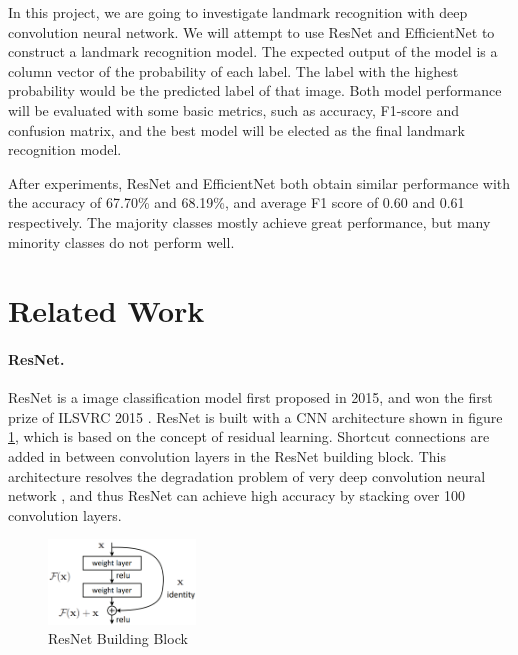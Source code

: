 \documentclass[10pt,twocolumn,letterpaper]{article}
\begin{document}
In this project, we are going to investigate landmark recognition with deep convolution neural network. We will attempt to use ResNet\cite{he_deep_2015} and EfficientNet\cite{tan_efficientnet_2020} to construct a landmark recognition model. The expected output of the model is a column vector of the probability of each label. The label with the highest probability would be the predicted label of that image. Both model performance will be evaluated with some basic metrics, such as accuracy, F1-score and confusion matrix, and the best model will be elected as the final landmark recognition model.

After experiments, ResNet and EfficientNet both obtain similar performance with the accuracy of 67.70\% and 68.19\%, and average F1 score of 0.60 and 0.61 respectively. The majority classes mostly achieve great performance, but many minority classes do not perform well.

\section{Related Work}
\paragraph{ResNet.} ResNet \cite{he_deep_2015} is a image classification model first proposed in 2015, and won the first prize of ILSVRC 2015 \cite{ILSVRC15}. ResNet is built with a CNN architecture shown in figure \ref{fig:resnet_block}, which is based on the concept of residual learning. Shortcut connections are added in between convolution layers in the ResNet building block. This architecture resolves the degradation problem of very deep convolution neural network \cite{he_deep_2015}, and thus ResNet can achieve high accuracy by stacking over 100 convolution layers.

\begin{figure}
    \centering
    \includegraphics[width=0.35\textwidth]{img/ResNet building blocks.png}
    \caption{ResNet Building Block \cite{he_deep_2015}}
    \label{fig:resnet_block}
\end{figure}
\end{document}
